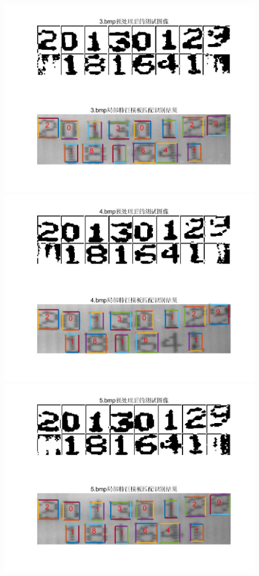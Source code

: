 \documentclass[cn]{elegantbook}
\begin{document}
\begin{figure}[!h]
\begin{minipage}[t]{0.48\textwidth}
		\includegraphics[width=\textwidth]{save23}
	\end{minipage}
	\begin{minipage}[t]{0.48\textwidth}
		\centering
		\includegraphics[width=\textwidth]{save24}
	\end{minipage}
	\begin{minipage}[t]{0.48\textwidth}
		\centering
		\includegraphics[width=\textwidth]{save25}

\end{minipage}
\end{figure}
\end{document}
